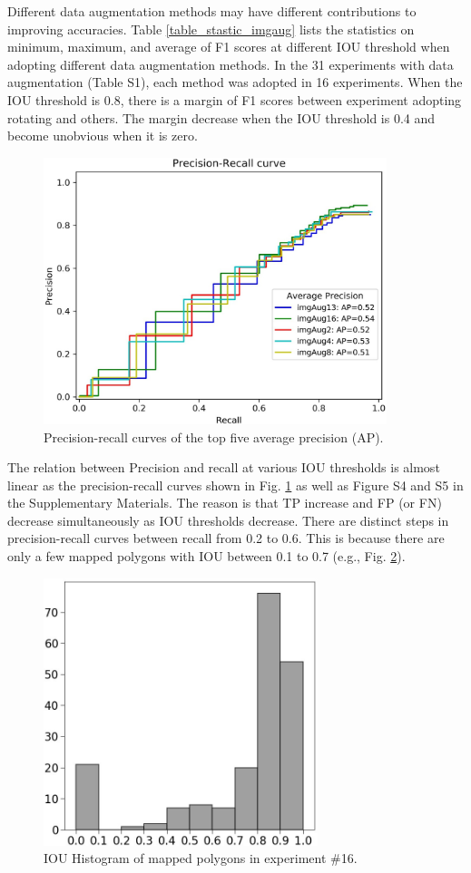 \documentclass[preprint,12pt,authoryear]{elsarticle}
\begin{document}
Different data augmentation methods may have different contributions to improving accuracies. Table \ref{table_stastic_imgaug} lists the statistics on minimum, maximum, and average of F1 scores at different IOU threshold when adopting different data augmentation methods. In the 31 experiments with data augmentation (Table S1), each method was adopted in 16 experiments. When the IOU threshold is 0.8, there is a margin of F1 scores between experiment adopting rotating and others. The margin decrease when the IOU threshold is 0.4 and become unobvious when it is zero. 

\begin{figure}
	\centering
	\includegraphics[width=10cm]{figures/top5_curves_trim.jpg}
	\caption{Precision-recall curves of the top five average precision (AP).}
	\label{fig_ap_top5}
\end{figure}

The relation between Precision and recall at various IOU thresholds is almost linear as the precision-recall curves shown in Fig. \ref{fig_ap_top5} as well as Figure S4 and S5 in the Supplementary Materials. The reason is that TP increase and FP (or FN) decrease simultaneously as IOU thresholds decrease. There are distinct steps in precision-recall curves between recall from 0.2 to 0.6. This is because there are only a few mapped polygons with IOU between 0.1 to 0.7 (e.g., Fig. \ref{fig_iou_hist_exp16}).

\begin{figure}
	\centering
	\includegraphics[width=8cm]{figures/IoU_imgAug16_new_trim.jpg}
	\caption{IOU Histogram of mapped polygons in experiment \#16.}
	\label{fig_iou_hist_exp16}
\end{figure}
\end{document}
